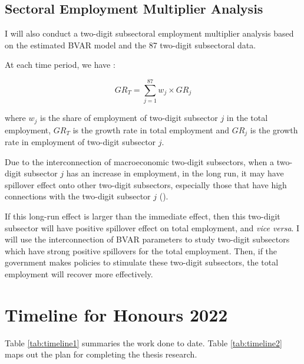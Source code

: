 \documentclass{monashthesis}
\begin{document}
\newpage

\hypertarget{sectoral-employment-multiplier-analysis}{%
\section{Sectoral Employment Multiplier Analysis}\label{sectoral-employment-multiplier-analysis}}

I will also conduct a two-digit subsectoral employment multiplier analysis based on the estimated BVAR model and the 87 two-digit subsectoral data.

At each time period, we have :

\[
GR_T=\sum_{j=1}^{87} w_j\times {GR}_j
\]

where \(w_j\) is the share of employment of two-digit subsector \(j\) in the total employment, \(GR_T\) is the growth rate in total employment and \(GR_j\) is the growth rate in employment of two-digit subsector \(j\).

Due to the interconnection of macroeconomic two-digit subsectors, when a two-digit subsector \(j\) has an increase in employment, in the long run, it may have spillover effect onto other two-digit subsectors, especially those that have high connections with the two-digit subsector \(j\) (\textcite{anderson2020}).

If this long-run effect is larger than the immediate effect, then this two-digit subsector will have positive spillover effect on total employment, and \emph{vice versa}. I will use the interconnection of BVAR parameters to study two-digit subsectors which have strong positive spillovers for the total employment. Then, if the government makes policies to stimulate these two-digit subsectors, the total employment will recover more effectively.

\newpage

\hypertarget{timeline-for-honours-2022}{%
\chapter{Timeline for Honours 2022}\label{timeline-for-honours-2022}}

Table \ref{tab:timeline1} summaries the work done to date. Table \ref{tab:timeline2} maps out the plan for completing the thesis research.
\end{document}
